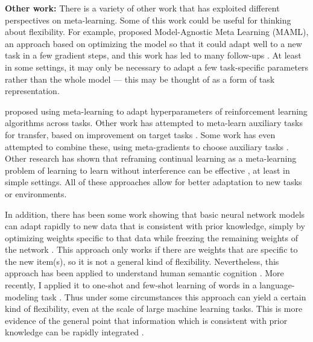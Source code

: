 \textbf{Other work:} There is a variety of other work that has exploited different perspectives on meta-learning. Some of this work could be useful for thinking about flexibility. For example, \citet{Finn2017a} proposed Model-Agnostic Meta Learning (MAML), an approach based on optimizing the model so that it could adapt well to a new task in a few gradient steps, and this work has led to many follow-ups \citep[e.g.][]{Finn2017, Finn2018, Nichol2018}. At least in some settings, it may only be necessary to adapt a few task-specific parameters rather than the whole model \citep{Zintgraf2018} --- this may be thought of as a form of task representation. \par
\citet{Xu2018} proposed using meta-learning to adapt hyperparameters of reinforcement learning algorithms across tasks. Other work has attempted to meta-learn auxiliary tasks for transfer, based on improvement on target tasks \citep{Liu2019a}. Some work has even attempted to combine these, using meta-gradients to choose auxiliary tasks \citep{Veeriah2019}. Other research has shown that reframing continual learning as a meta-learning problem of learning to learn without interference can be effective \citep{Velez2017}, at least in simple settings. All of these approaches allow for better adaptation to new tasks or environments. \par
In addition, there has been some work showing that basic neural network models can adapt rapidly to new data that is consistent with prior knowledge, simply by optimizing weights specific to that data while freezing the remaining weights of the network \citep{Rumelhart1993}. This approach only works if there are weights that are specific to the new item(s), so it is not a general kind of flexibility. Nevertheless, this approach has been applied to understand human semantic cognition \citep{Rogers2004}. More recently, I applied it to one-shot and few-shot learning of words in a language-modeling task \citep{Lampinen2018a}. Thus under some circumstances this approach can yield a certain kind of flexibility, even at the scale of large machine learning tasks. This is more evidence of the general point that information which is consistent with prior knowledge can be rapidly integrated \citep{McClelland2013, McClelland2020}. \par 

